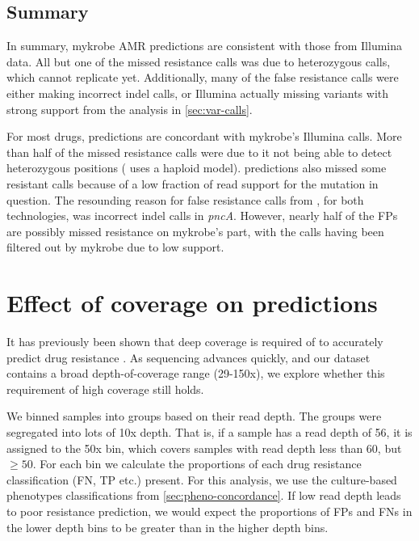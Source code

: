 \subsection{Summary}

In summary, mykrobe \ont{} AMR predictions are consistent with those from Illumina data. All but one of the missed resistance calls was due to heterozygous calls, which \ont{} cannot replicate yet. Additionally, many of the false resistance calls were either \ont{} making incorrect indel calls, or Illumina actually missing variants with strong support from the analysis in \autoref{sec:var-calls}.

For most drugs, \drprg{} predictions are concordant with mykrobe's Illumina calls. More than half of the \drprg{} missed resistance calls were due to it not being able to detect heterozygous positions (\pandora{} uses a haploid model). \drprg{} \ont{} predictions also missed some resistant calls because of a low fraction of read support for the mutation in question. The resounding reason for false resistance calls from \drprg{}, for both technologies, was incorrect indel calls in \textit{pncA}. However, nearly half of the \drprg{} FPs are possibly missed resistance on mykrobe's part, with the calls having been filtered out by mykrobe due to low support. 

\section{Effect of \ont{} coverage on predictions}
\label{sec:dst-covg}

It has previously been shown that deep coverage is required of \ont{} to accurately predict drug resistance \cite{Votintseva2017}. As \ont{} sequencing advances quickly, and our dataset contains a broad \ont{} depth-of-coverage range (29-150x), we explore whether this requirement of high coverage still holds.

We binned samples into groups based on their read depth. The groups were segregated into lots of 10x depth. That is, if a sample has a read depth of 56, it is assigned to the 50x bin, which covers samples with read depth less than 60, but $\ge50$. For each bin we calculate the proportions of each drug resistance classification (FN, TP etc.) present. For this analysis, we use the culture-based phenotypes classifications from \autoref{sec:pheno-concordance}. If low read depth leads to poor resistance prediction, we would expect the proportions of FPs and FNs in the lower depth bins to be greater than in the higher depth bins. 

